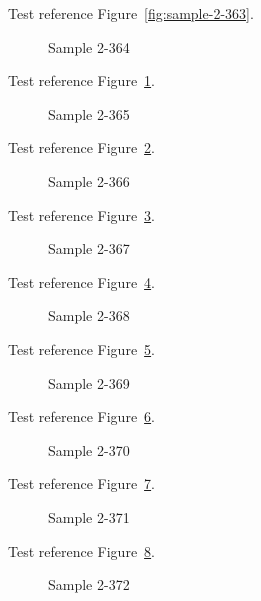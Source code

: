 Test reference Figure~\ref{fig:sample-2-363}.

\begin{figure}[tbhp]
\caption{Sample 2-364}
\label{fig:sample-2-364}
\end{figure}

Test reference Figure~\ref{fig:sample-2-364}.

\begin{figure}[tbhp]
\caption{Sample 2-365}
\label{fig:sample-2-365}
\end{figure}

Test reference Figure~\ref{fig:sample-2-365}.

\begin{figure}[tbhp]
\caption{Sample 2-366}
\label{fig:sample-2-366}
\end{figure}

Test reference Figure~\ref{fig:sample-2-366}.

\begin{figure}[tbhp]
\caption{Sample 2-367}
\label{fig:sample-2-367}
\end{figure}

Test reference Figure~\ref{fig:sample-2-367}.

\begin{figure}[tbhp]
\caption{Sample 2-368}
\label{fig:sample-2-368}
\end{figure}

Test reference Figure~\ref{fig:sample-2-368}.

\begin{figure}[tbhp]
\caption{Sample 2-369}
\label{fig:sample-2-369}
\end{figure}

Test reference Figure~\ref{fig:sample-2-369}.

\begin{figure}[tbhp]
\caption{Sample 2-370}
\label{fig:sample-2-370}
\end{figure}

Test reference Figure~\ref{fig:sample-2-370}.

\begin{figure}[tbhp]
\caption{Sample 2-371}
\label{fig:sample-2-371}
\end{figure}

Test reference Figure~\ref{fig:sample-2-371}.

\begin{figure}[tbhp]
\caption{Sample 2-372}
\label{fig:sample-2-372}
\end{figure}

